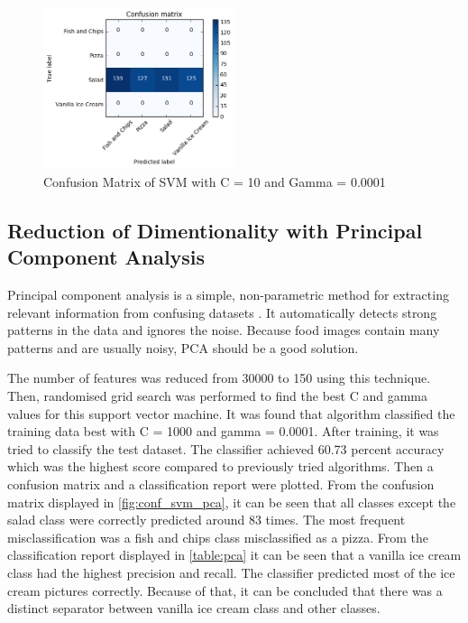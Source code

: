 \begin{figure}[h]
\centering
\includegraphics[width=0.5\textwidth]{Figures/svm2.png}
\caption{Confusion Matrix of SVM with C = 10 and Gamma = 0.0001}
\label{fig:svd}
\end{figure}


\subsection{Reduction of  Dimentionality with Principal Component Analysis}
Principal component analysis is a simple, non-parametric method for extracting relevant information from confusing datasets \citep{pca}. It automatically detects strong patterns in the data and ignores the noise. Because food images contain many patterns and are usually noisy, PCA should be a good solution.  

The number of features was reduced from 30000 to 150 using this technique. Then, randomised grid search was performed to find the best C and gamma values for this support vector machine. 
It was found that algorithm classified the training data best with C = 1000 and gamma = 0.0001. After training, it was tried to classify the test dataset. The classifier achieved 60.73 percent accuracy which was the highest score compared to previously tried algorithms. Then a  confusion matrix and a classification report were plotted. From the confusion matrix displayed in \autoref{fig:conf_svm_pca}, it can be seen that all classes except the salad class were correctly predicted around 83 times. The most frequent misclassification was a fish and chips class misclassified as a pizza. From the classification report displayed in    \autoref{table:pca} it can be seen that a vanilla ice cream class had the highest precision and recall. The classifier predicted most of the ice cream pictures correctly. Because of that, it can be concluded that there was a distinct separator between vanilla ice cream class and other classes.

